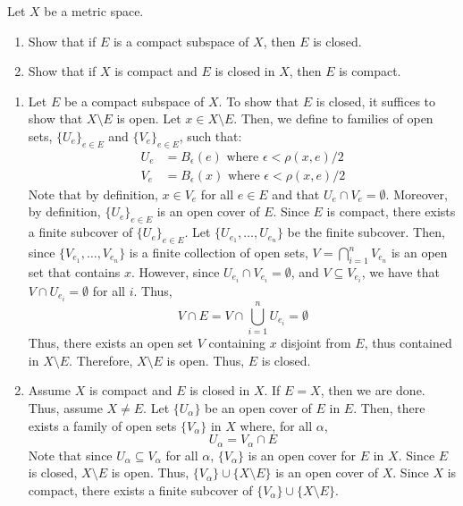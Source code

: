 \documentclass[12pt]{article}
\begin{document}
\newpage

\begin{problem}{2}
    Let $X$ be a metric space. 
    \begin{enumerate}
        \item Show that if $E$ is a compact subspace of $X$, then $E$ is closed. 
        \item Show that if $X$ is compact and $E$ is closed in $X$, then $E$ is compact.
    \end{enumerate}
\end{problem}
\begin{solution}
    \bbni
    \begin{enumerate}
        \item Let $E$ be a compact subspace of $X$. To show that $E$ is closed, it suffices to show that $X \setminus E$ is open. Let $x \in X \setminus E$. Then, we define to families of open sets, $\{U_e\}_{e \in E}$ and $\{V_e\}_{e \in E}$, such that:
        \begin{align*}
            U_e &= B_{\epsilon}(e) \text{ where } \epsilon < \rho(x,e)/2 \\
            V_e &= B_{\epsilon}(x) \text{ where } \epsilon < \rho(x,e)/2
        \end{align*} 
        Note that by definition, $x \in V_e$ for all $e \in E$ and that $U_e \cap V_e = \emptyset$. Moreover, by definition, $\{U_e\}_{e\in E}$ is an open cover of $E$. Since $E$ is compact, there exists a finite subcover of $\{U_e\}_{e \in E}$. Let $\{U_{e_1}, \ldots, U_{e_n}\}$ be the finite subcover. Then, since $\{V_{e_1}, \ldots, V_{e_n}\}$ is a finite collection of open sets, $V = \bigcap_{i=1}^n V_{e_n}$ is an open set that contains $x$. However, since $U_{e_i} \cap V_{e_i} = \emptyset$, and $V \subseteq V_{e_i}$, we have that $V \cap U_{e_i} = \emptyset$ for all $i$. Thus,
        \[  V \cap E = V \cap \bigcup_{i=1}^n U_{e_i} = \emptyset\]
        Thus, there exists an open set $V$ containing $x$ disjoint from $E$, thus contained in $X \setminus E$. Therefore, $X \setminus E$ is open. Thus, $E$ is closed.
        \item Assume $X$ is compact and $E$ is closed in $X$. If $E = X$, then we are done. Thus, assume $X \neq E$. Let $\{U_\alpha\}$ be an open cover of $E$ in $E$. Then, there exists a family of open sets $\{V_\alpha\}$ in $X$ where, for all $\alpha$,
        \[ U_\alpha = V_\alpha \cap E \]
        Note that since $U_\alpha \subseteq V_\alpha$ for all $\alpha$, $\{V_\alpha\}$ is an open cover for $E$ in $X$. Since $E$ is closed, $X \setminus E$ is open. Thus, $\{V_\alpha\} \cup \{X \setminus E\}$ is an open cover of $X$. Since $X$ is compact, there exists a finite subcover of $\{V_\alpha\} \cup \{X \setminus E\}$. \bbni 

\end{enumerate}
\end{solution}
\end{document}
